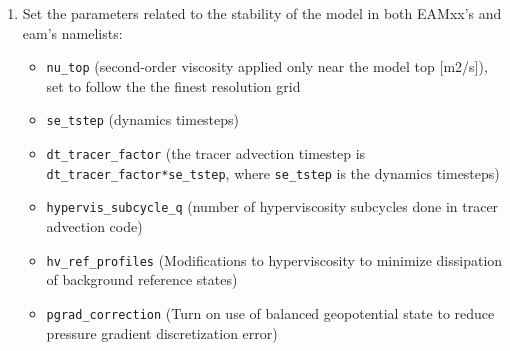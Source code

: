 \documentclass[journal abbreviation, manuscript]{copernicus}
\begin{document}
\begin{enumerate}
\item Set the parameters related to the stability of the model in both EAMxx's and eam's namelists:
    \begin{itemize}
    \item \verb|nu_top| (second-order viscosity applied only near the model top [m2/s]), set to follow the the finest resolution grid
    \item \verb|se_tstep| (dynamics timesteps)
    \item \verb|dt_tracer_factor| (the tracer advection timestep is \verb|dt_tracer_factor*se_tstep|, where \verb|se_tstep| is the dynamics timesteps)
    \item \verb|hypervis_subcycle_q| (number of hyperviscosity subcycles done in tracer advection code)
    \item \verb|hv_ref_profiles| (Modifications to hyperviscosity to minimize dissipation of background reference states)
    \item \verb|pgrad_correction| (Turn on use of balanced geopotential state to reduce pressure gradient discretization error)
    \end{itemize}
    \end{enumerate}
\vspace{\baselineskip}
\end{document}
